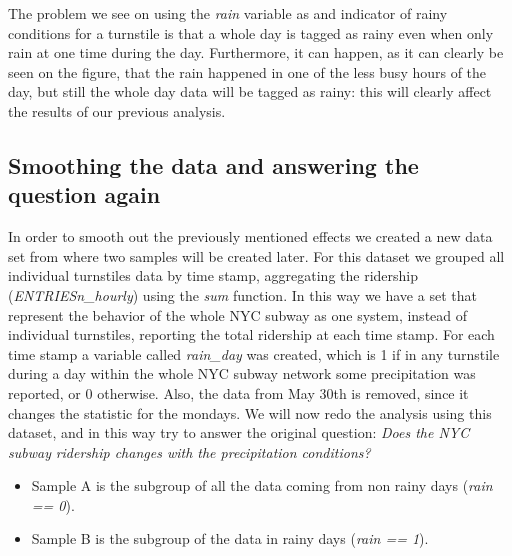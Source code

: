 \documentclass[a4paper,12pt,english]{sphinxmanual}
\begin{document}
The problem we see on using the \emph{rain} variable as and indicator of rainy conditions
for a turnstile is that a whole day is tagged as rainy even when only rain at one
time during the day. Furthermore, it can happen, as it can clearly be seen on the figure,
that the rain happened in one of the less busy hours of the day, but still the whole
day data will be tagged as rainy: this will clearly affect the results of our
previous analysis.


\subsection{Smoothing the data and answering the question again}
\label{section1:smoothing-the-data-and-answering-the-question-again}
In order to smooth out the previously mentioned effects we created a new data
set from where two samples will be created later. For this dataset we grouped
all individual turnstiles data by time stamp, aggregating the ridership
(\emph{ENTRIESn\_hourly}) using the \emph{sum} function. In this way we have a set that
represent the behavior of the whole NYC subway as one system, instead of
individual turnstiles, reporting the total ridership at each time stamp. For each
time stamp a variable called \emph{rain\_day} was created, which is 1 if in any
turnstile during a day within the whole NYC subway network some precipitation
was reported, or 0 otherwise. Also, the data from May 30th is removed, since it
changes the statistic for the mondays. We will now redo the analysis using this
dataset, and in this way try to answer the original question: \emph{Does the NYC subway}
\emph{ridership changes with the precipitation conditions?}
\begin{itemize}
\item {} 
Sample A is the subgroup of all the data coming from non rainy days (\emph{rain == 0}).

\item {} 
Sample B is the subgroup of the data in rainy days (\emph{rain == 1}).

\end{itemize}
\end{document}
